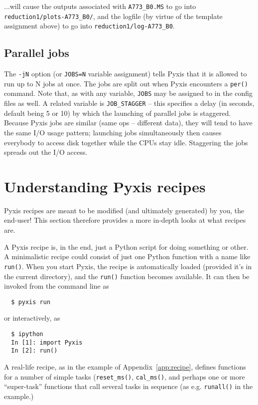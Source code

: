 \documentclass[a4paper,10pt]{article}
\begin{document}
...will cause the outputs associated with {\tt A773\_B0.MS} to go into {\tt reduction1/plots-A773\_B0/}, and the logfile (by virtue of the template assignment above) to go into {\tt reduction1/log-A773\_B0}.

\subsection{Parallel jobs}

The {\tt -jN} option (or {\tt JOBS=N} variable assignment) tells Pyxis that it is allowed to run up to N jobs at once. The jobs are split out when Pyxis encounters a {\tt per()} command. Note that, as with any variable, {\tt JOBS} may be assigned to in the config files as well. A related variable is {\tt JOB\_STAGGER} -- this specifies a delay (in seconds, default being 5 or 10) by which the launching of parallel jobs is staggered. Because Pyxis jobs are similar (same ops -- different data), they will tend to have the same I/O usage pattern; launching jobs simultaneously then causes everybody to access disk together while the CPUs stay idle. Staggering the jobs spreads out the I/O access.

\section{Understanding Pyxis recipes}

Pyxis recipes are meant to be modified (and ultimately generated) by you, the end-user! This section therefore provides a more in-depth looks at what recipes are.

A Pyxis recipe is, in the end, just a Python script for doing something or other. A minimalistic recipe could consist of just one Python function with a name like {\tt run()}. When you start Pyxis, the recipe is automatically loaded (provided it's in the current directory), and the {\tt run()} function becomes available. It can then be invoked from the command line as

\begin{verbatim}
  $ pyxis run
\end{verbatim}

or interactively, as

\begin{verbatim}
  $ ipython
  In [1]: import Pyxis
  In [2]: run()
\end{verbatim}

A real-life recipe, as in the example of Appendix~\ref{app:recipe}, defines functions for a number of simple tasks ({\tt reset\_ms()}, {\tt cal\_ms()}, and perhaps one or more ``super-task'' functions that call several tasks in sequence (as e.g. {\tt runall()} in the example.) 
\end{document}
